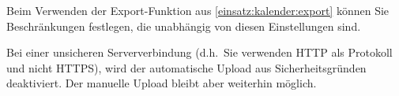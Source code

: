 \begin{hinweis}
  Beim Verwenden der Export-Funktion aus \cref{einsatz:kalender:export} können Sie Beschränkungen festlegen, die unabhängig von diesen Einstellungen sind.
\end{hinweis}

\begin{neu}
\begin{hinweis}
  Bei einer unsicheren Serververbindung (d.h.\ Sie verwenden HTTP als Protokoll und nicht HTTPS),
  wird der automatische Upload aus Sicherheitsgründen deaktiviert.
  Der manuelle Upload bleibt aber weiterhin möglich.
\end{hinweis}
\end{neu}
